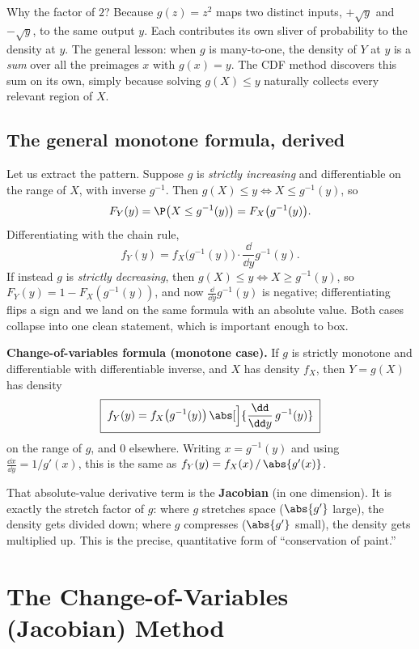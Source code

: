 \begin{whybox}
Why the factor of $2$? Because $g(z)=z^2$ maps two distinct inputs, $+\sqrt{y}$ and
$-\sqrt{y}$, to the same output $y$. Each contributes its own sliver of probability to the
density at $y$. The general lesson: when $g$ is many-to-one, the density of $Y$ at $y$ is a
\emph{sum} over all the preimages $x$ with $g(x)=y$. The CDF method discovers this sum on
its own, simply because solving $g(X)\le y$ naturally collects every relevant region of
$X$.
\end{whybox}

\subsection{The general monotone formula, derived}

Let us extract the pattern. Suppose $g$ is \emph{strictly increasing} and differentiable
on the range of $X$, with inverse $g^{-1}$. Then $g(X)\le y \iff X \le g^{-1}(y)$, so
\[
  F_Y(y) = \P\big(X \le g^{-1}(y)\big) = F_X\big(g^{-1}(y)\big).
\]
Differentiating with the chain rule,
\[
  f_Y(y) = f_X\big(g^{-1}(y)\big)\cdot \frac{\dd}{\dd y} g^{-1}(y).
\]
If instead $g$ is \emph{strictly decreasing}, then $g(X)\le y \iff X \ge g^{-1}(y)$, so
$F_Y(y) = 1 - F_X(g^{-1}(y))$, and now $\tfrac{\dd}{\dd y}g^{-1}(y)$ is negative;
differentiating flips a sign and we land on the same formula with an absolute value. Both
cases collapse into one clean statement, which is important enough to box.

\begin{formalbox}
\textbf{Change-of-variables formula (monotone case).} If $g$ is strictly monotone and
differentiable with differentiable inverse, and $X$ has density $f_X$, then $Y=g(X)$ has
density
\[
  \boxed{\;f_Y(y) = f_X\big(g^{-1}(y)\big)\,\abs[\Big]{\frac{\dd}{\dd y}\,g^{-1}(y)}\;}
\]
on the range of $g$, and $0$ elsewhere. Writing $x = g^{-1}(y)$ and using
$\tfrac{\dd x}{\dd y} = 1/g'(x)$, this is the same as
$f_Y(y) = f_X(x)\,/\,\abs{g'(x)}$.
\end{formalbox}

That absolute-value derivative term is the \textbf{Jacobian} (in one dimension). It is
exactly the stretch factor of $g$: where $g$ stretches space ($\abs{g'}$ large), the
density gets divided down; where $g$ compresses ($\abs{g'}$ small), the density gets
multiplied up. This is the precise, quantitative form of ``conservation of paint.''

\section{The Change-of-Variables (Jacobian) Method}
\label{ch16:jacobian}

